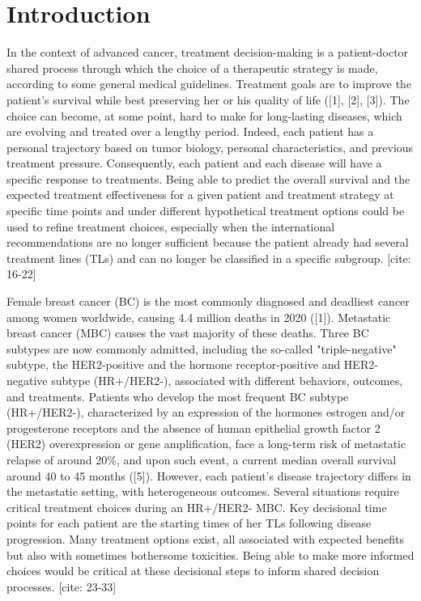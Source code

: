 \documentclass[a4paper,10pt]{article}
\begin{document}
\section{Introduction}
In the context of advanced cancer, treatment decision-making is a patient-doctor shared process through which the choice of a therapeutic strategy is made, according to some general medical guidelines. Treatment goals are to improve the patient's survival while best preserving her or his quality of life ([1], [2], [3]). The choice can become, at some point, hard to make for long-lasting diseases, which are evolving and treated over a lengthy period. Indeed, each patient has a personal trajectory based on tumor biology, personal characteristics, and previous treatment pressure. Consequently, each patient and each disease will have a specific response to treatments. Being able to predict the overall survival and the expected treatment effectiveness for a given patient and treatment strategy at specific time points and under different hypothetical treatment options could be used to refine treatment choices, especially when the international recommendations are no longer sufficient because the patient already had several treatment lines (TLs) and can no longer be classified in a specific subgroup. [cite: 16-22]

Female breast cancer (BC) is the most commonly diagnosed and deadliest cancer among women worldwide, causing 4.4 million deaths in 2020 ([1]). Metastatic breast cancer (MBC) causes the vast majority of these deaths. Three BC subtypes are now commonly admitted, including the so-called "triple-negative" subtype, the HER2-positive and the hormone receptor-positive and HER2-negative subtype (HR+/HER2-), associated with different behaviors, outcomes, and treatments. Patients who develop the most frequent BC subtype (HR+/HER2-), characterized by an expression of the hormones estrogen and/or progesterone receptors and the absence of human epithelial growth factor 2 (HER2) overexpression or gene amplification, face a long-term risk of metastatic relapse of around 20\%, and upon such event, a current median overall survival around 40 to 45 months ([5]). However, each patient's disease trajectory differs in the metastatic setting, with heterogeneous outcomes. Several situations require critical treatment choices during an HR+/HER2- MBC. Key decisional time points for each patient are the starting times of her TLs following disease progression. Many treatment options exist, all associated with expected benefits but also with sometimes bothersome toxicities. Being able to make more informed choices would be critical at these decisional steps to inform shared decision processes. [cite: 23-33]
\end{document}
